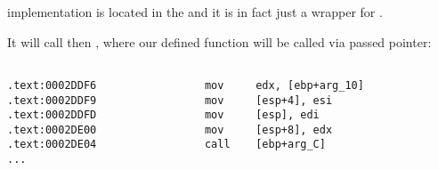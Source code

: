 {\qsort implementation is located in the  and it is in fact just a wrapper for .}

{It will call then , where our defined function will be called via passed pointer:}


\begin{lstlisting}[caption=
\IFRU{(файл libc.so.6, версия glibc ~--- 2.10.1)}{(File libc.so.6, glibc version ~--- 2.10.1)}]

.text:0002DDF6                 mov     edx, [ebp+arg_10]
.text:0002DDF9                 mov     [esp+4], esi
.text:0002DDFD                 mov     [esp], edi
.text:0002DE00                 mov     [esp+8], edx
.text:0002DE04                 call    [ebp+arg_C]
...
\end{lstlisting}
